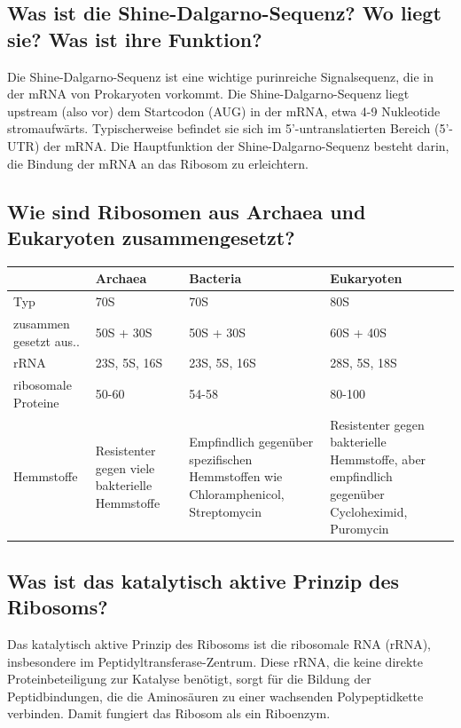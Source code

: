 \documentclass{article}
\begin{document}
\subsection*{Was ist  die Shine-Dalgarno-Sequenz?
Wo liegt sie? Was ist  ihre Funktion?}
Die Shine-Dalgarno-Sequenz ist eine wichtige purinreiche Signalsequenz, die in der mRNA von Prokaryoten vorkommt. \newline
Die Shine-Dalgarno-Sequenz liegt upstream (also vor) dem Startcodon (AUG) in der mRNA, etwa 4-9 Nukleotide stromaufwärts. Typischerweise befindet sie sich im 5'-untranslatierten Bereich (5'-UTR) der mRNA. \newline
Die Hauptfunktion der Shine-Dalgarno-Sequenz besteht darin, die Bindung der mRNA an das Ribosom zu erleichtern.

\subsection*{Wie sind Ribosomen aus Archaea und Eukaryoten zusammengesetzt?} 
\begin{table}[H]
    \centering
    \begin{tabular}{ |p{2cm}|| p{4cm}| p{4cm}| p{4cm}|}
    \hline
     & Archaea & Bacteria & Eukaryoten \\ \hline \hline
    Typ &  70S & 70S & 80S\\ \hline
    zusammen gesetzt aus.. & 50S + 30S  & 50S + 30S & 60S + 40S  \\\hline
    rRNA & 23S, 5S, 16S & 23S, 5S, 16S & 28S, 5S, 18S  \\\hline
    ribosomale Proteine & 50-60 & 54-58 & 80-100 \\\hline
    Hemmstoffe & Resistenter gegen viele bakterielle Hemmstoffe & Empfindlich gegenüber spezifischen Hemmstoffen wie Chloramphenicol, Streptomycin & Resistenter gegen bakterielle Hemmstoffe, aber empfindlich gegenüber Cycloheximid, Puromycin \\\hline
\end{tabular}
\end{table}

\subsection*{Was ist das katalytisch aktive Prinzip des Ribosoms?}
Das katalytisch aktive Prinzip des Ribosoms ist die ribosomale RNA (rRNA), insbesondere im Peptidyltransferase-Zentrum. Diese rRNA, die keine direkte Proteinbeteiligung zur Katalyse benötigt, sorgt für die Bildung der Peptidbindungen, die die Aminosäuren zu einer wachsenden Polypeptidkette verbinden. Damit fungiert das Ribosom als ein Riboenzym.
\end{document}
